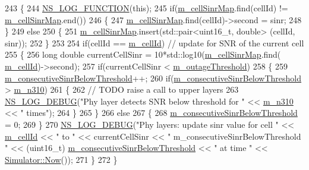 \begin{DoxyCode}
243 \{
244         \hyperlink{log-macros-disabled_8h_a90b90d5bad1f39cb1b64923ea94c0761}{NS\_LOG\_FUNCTION}(\textcolor{keyword}{this});
245         \textcolor{keywordflow}{if}(\hyperlink{classns3_1_1MmWaveUePhy_a650930b1b37094b98bfa45e5806d069e}{m\_cellSinrMap}.find(cellId) != \hyperlink{classns3_1_1MmWaveUePhy_a650930b1b37094b98bfa45e5806d069e}{m\_cellSinrMap}.end())
246         \{
247                 \hyperlink{classns3_1_1MmWaveUePhy_a650930b1b37094b98bfa45e5806d069e}{m\_cellSinrMap}.find(cellId)->second = sinr;
248         \}
249         \textcolor{keywordflow}{else}
250         \{
251                 \hyperlink{classns3_1_1MmWaveUePhy_a650930b1b37094b98bfa45e5806d069e}{m\_cellSinrMap}.insert(std::pair<uint16\_t, double> (cellId, sinr));
252         \}
253 
254         \textcolor{keywordflow}{if}(cellId == \hyperlink{classns3_1_1MmWavePhy_a0594531da45f93220d4f5de292bae823}{m\_cellId}) \textcolor{comment}{// update for SNR of the current cell}
255         \{
256                 \textcolor{keywordtype}{long} \textcolor{keywordtype}{double} currentCellSinr = 10*std::log10(\hyperlink{classns3_1_1MmWaveUePhy_a650930b1b37094b98bfa45e5806d069e}{m\_cellSinrMap}.find(
      \hyperlink{classns3_1_1MmWavePhy_a0594531da45f93220d4f5de292bae823}{m\_cellId})->second);
257                 \textcolor{keywordflow}{if}(currentCellSinr < \hyperlink{classns3_1_1MmWaveUePhy_a70f5b46f9b554efd5c33d859250056ce}{m\_outageThreshold})
258                 \{
259                         \hyperlink{classns3_1_1MmWaveUePhy_a3970be469e9bda8a29a87de38daac1ca}{m\_consecutiveSinrBelowThreshold}++;
260                         \textcolor{keywordflow}{if}(\hyperlink{classns3_1_1MmWaveUePhy_a3970be469e9bda8a29a87de38daac1ca}{m\_consecutiveSinrBelowThreshold} > 
      \hyperlink{classns3_1_1MmWaveUePhy_ab1c52c20727e1c5a2fdf1599c0d5d3f5}{m\_n310})
261                         \{
262                                 \textcolor{comment}{// TODO raise a call to upper layers}
263                                 \hyperlink{group__logging_ga413f1886406d49f59a6a0a89b77b4d0a}{NS\_LOG\_DEBUG}(\textcolor{stringliteral}{"Phy layer detects SNR below threshold for "} << 
      \hyperlink{classns3_1_1MmWaveUePhy_ab1c52c20727e1c5a2fdf1599c0d5d3f5}{m\_n310} << \textcolor{stringliteral}{" times"});
264                         \}
265                 \}
266                 \textcolor{keywordflow}{else}
267                 \{
268                         \hyperlink{classns3_1_1MmWaveUePhy_a3970be469e9bda8a29a87de38daac1ca}{m\_consecutiveSinrBelowThreshold} = 0;
269                 \}       
270                 \hyperlink{group__logging_ga413f1886406d49f59a6a0a89b77b4d0a}{NS\_LOG\_DEBUG}(\textcolor{stringliteral}{"Phy layers: update sinr value for cell "} << 
      \hyperlink{classns3_1_1MmWavePhy_a0594531da45f93220d4f5de292bae823}{m\_cellId} << \textcolor{stringliteral}{" to "} << currentCellSinr << \textcolor{stringliteral}{" m\_consecutiveSinrBelowThreshold "} << (uint16\_t)
      \hyperlink{classns3_1_1MmWaveUePhy_a3970be469e9bda8a29a87de38daac1ca}{m\_consecutiveSinrBelowThreshold} << \textcolor{stringliteral}{" at time "} << 
      \hyperlink{classns3_1_1Simulator_ac3178fa975b419f7875e7105be122800}{Simulator::Now}());
271         \}
272 \}
\end{DoxyCode}


